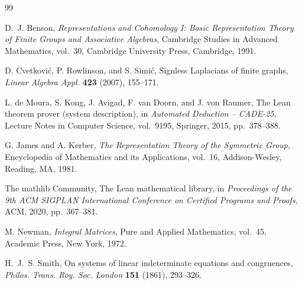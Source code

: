 \documentclass[11pt]{amsart}
\theoremstyle{definition}
\theoremstyle{remark}
\begin{document}
\begin{thebibliography}{99}

D.~J. Benson,
\emph{Representations and Cohomology I: Basic Representation Theory of Finite Groups and Associative Algebras},
Cambridge Studies in Advanced Mathematics, vol.~30, Cambridge University Press, Cambridge, 1991.

D. Cvetkovi\'{c}, P. Rowlinson, and S. Simi\'{c},
Signless Laplacians of finite graphs,
\emph{Linear Algebra Appl.} \textbf{423} (2007), 155--171.

L. de Moura, S. Kong, J. Avigad, F. van Doorn, and J. von Raumer,
The Lean theorem prover (system description),
in \emph{Automated Deduction -- CADE-25}, Lecture Notes in Computer Science, vol.~9195, Springer, 2015, pp.~378--388.

G. James and A. Kerber,
\emph{The Representation Theory of the Symmetric Group},
Encyclopedia of Mathematics and its Applications, vol.~16, Addison-Wesley, Reading, MA, 1981.

The mathlib Community,
The Lean mathematical library,
in \emph{Proceedings of the 9th ACM SIGPLAN International Conference on Certified Programs and Proofs}, ACM, 2020, pp.~367--381.

M. Newman,
\emph{Integral Matrices},
Pure and Applied Mathematics, vol.~45, Academic Press, New York, 1972.

H.~J.~S. Smith,
On systems of linear indeterminate equations and congruences,
\emph{Philos. Trans. Roy. Soc. London} \textbf{151} (1861), 293--326.

\end{thebibliography}
\end{document}
